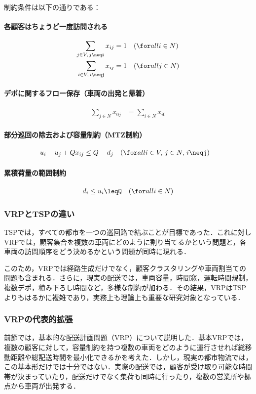 制約条件は以下の通りである：

\paragraph{各顧客はちょうど一度訪問される}
\begin{align}
\sum_{j\in V,\,j\neqi}x_{ij}&=1\quad(\for all i\in N)\\
\sum_{i\in V,\,i\neqj}x_{ij}&=1\quad(\for all j\in N)
\end{align}

\paragraph{デポに関するフロー保存（車両の出発と帰着）}
\begin{align}
\sum_{j\in N}x_{0j}&=\sum_{i\in N}x_{i0}
\end{align}

\paragraph{部分巡回の除去および容量制約（MTZ制約）}
\begin{align}
u_i-u_j+Qx_{ij}&\leq Q-d_j\quad(\for all i\in V,\,j\in N,\,i\neqj)
\end{align}

\paragraph{累積荷量の範囲制約}
\begin{align}
d_i\leq u_i\leqQ \quad(\for all i\in N)
\end{align}


\subsubsection{VRPとTSPの違い}

TSPでは，すべての都市を一つの巡回路で結ぶことが目標であった．これに対しVRPでは，顧客集合を複数の車両にどのように割り当てるかという問題と，各車両の訪問順序をどう決めるかという問題が同時に現れる．

このため，VRPでは経路生成だけでなく，顧客クラスタリングや車両割当ての問題も含まれる．さらに，現実の配送では，車両容量，時間窓，運転時間規制，複数デポ，積み下ろし時間など，多様な制約が加わる．その結果，VRPはTSPよりもはるかに複雑であり，実務上も理論上も重要な研究対象となっている．

\subsubsection{VRPの代表的拡張}
前節では，基本的な配送計画問題（VRP）について説明した．基本VRPでは，複数の顧客に対して，容量制約を持つ複数の車両をどのように運行させれば総移動距離や総配送時間を最小化できるかを考えた．しかし，現実の都市物流では，この基本形だけでは十分ではない．実際の配送では，顧客が受け取り可能な時間帯が決まっていたり，配送だけでなく集荷も同時に行ったり，複数の営業所や拠点から車両が出発する．

